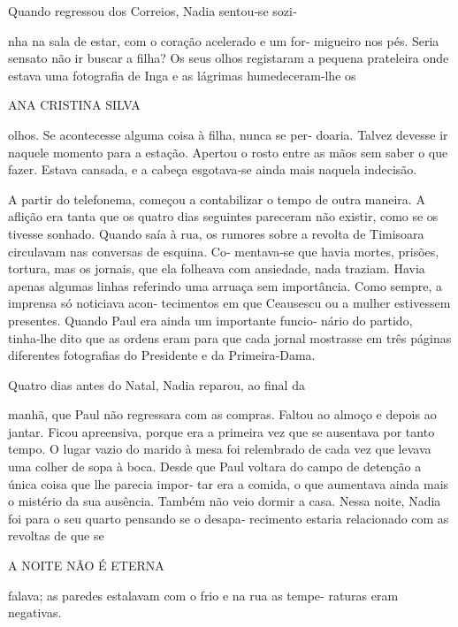 Quando regressou dos Correios, Nadia sentou‑se sozi‑

nha na sala de estar, com o coração acelerado e um for‑ migueiro nos
pés. Seria sensato não ir buscar a filha? Os seus olhos registaram a
pequena prateleira onde estava uma fotografia de Inga e as lágrimas
humedeceram‑lhe os

ANA CRISTINA SILVA

olhos. Se acontecesse alguma coisa à filha, nunca se per‑ doaria. Talvez
devesse ir naquele momento para a estação. Apertou o rosto entre as mãos
sem saber o que fazer. Estava cansada, e a cabeça esgotava‑se ainda mais
naquela indecisão.

A partir do telefonema, começou a contabilizar o tempo de outra maneira.
A aflição era tanta que os quatro dias seguintes pareceram não existir,
como se os tivesse sonhado. Quando saía à rua, os rumores sobre a
revolta de Timisoara circulavam nas conversas de esquina. Co‑ mentava‑se
que havia mortes, prisões, tortura, mas os jornais, que ela folheava com
ansiedade, nada traziam. Havia apenas algumas linhas referindo uma
arruaça sem importância. Como sempre, a imprensa só noticiava acon‑
tecimentos em que Ceausescu ou a mulher estivessem presentes. Quando
Paul era ainda um importante funcio‑ nário do partido, tinha‑lhe dito
que as ordens eram para que cada jornal mostrasse em três páginas
diferentes fotografias do Presidente e da Primeira‑Dama.

Quatro dias antes do Natal, Nadia reparou, ao final da

manhã, que Paul não regressara com as compras. Faltou ao almoço e depois
ao jantar. Ficou apreensiva, porque era a primeira vez que se ausentava
por tanto tempo. O lugar vazio do marido à mesa foi relembrado de cada
vez que levava uma colher de sopa à boca. Desde que Paul voltara do
campo de detenção a única coisa que lhe parecia impor‑ tar era a comida,
o que aumentava ainda mais o mistério da sua ausência. Também não veio
dormir a casa. Nessa noite, Nadia foi para o seu quarto pensando se o
desapa‑ recimento estaria relacionado com as revoltas de que se

A NOITE NÃO É ETERNA

falava; as paredes estalavam com o frio e na rua as tempe‑ raturas eram
negativas.

